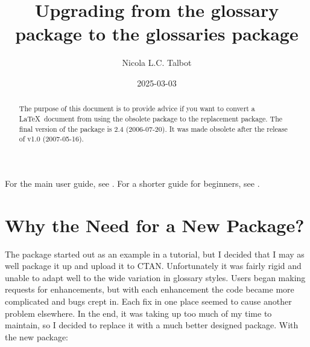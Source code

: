 \documentclass[titlepage=false,oneside,
 fontsize=12pt,captions=tableheading]{scrarticle}
\title{Upgrading from the glossary package to the glossaries
package}
\author{Nicola L.C. Talbot}
\date{2025-03-03}
\begin{document}
\maketitle

\htmlavailable

\begin{abstract}
The purpose of this document is to provide advice if you want to
convert a \LaTeX\ document from using the obsolete 
package to the replacement  package.
The final version of the  package is 2.4 (2006-07-20).
It was made obsolete after the release of 
v1.0 (2007-05-16). 
\end{abstract}

For the main  user guide, see
.
For a shorter guide for beginners, see
.

\tableofcontents

\section{Why the Need for a New Package?}
\label{whyglossaries}

The  package started out as an example in a tutorial,
but I decided that I may as well package it up and upload it to CTAN.
Unfortunately it was fairly rigid and unable to adapt well to the
wide variation in glossary styles. Users began making requests for
enhancements, but with each enhancement the code became more
complicated and bugs crept in. Each fix in one place seemed to cause
another problem elsewhere. In the end, it was taking up too much
of my time to maintain, so I decided to replace it with a much
better designed package. With the new  package:
\end{document}
